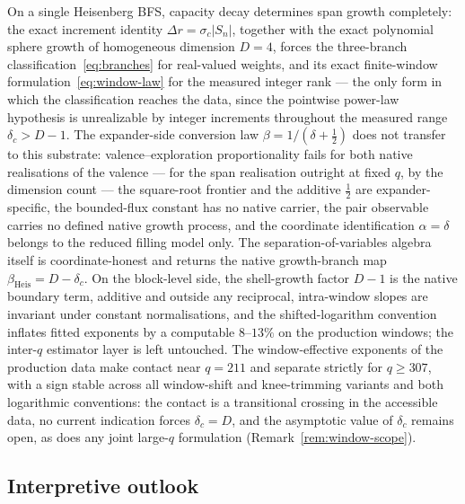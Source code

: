 \documentclass[11pt,a4paper]{article}
\theoremstyle{definition}
\newcommand{\dc}{\delta_c}
\begin{document}
On a single Heisenberg BFS, capacity decay determines span growth completely: the exact increment identity
$\Delta r = \sigma_c |S_n|$, together with the exact polynomial sphere growth of homogeneous dimension
$D = 4$, forces the three-branch classification~\eqref{eq:branches} for real-valued weights, and its exact
finite-window formulation~\eqref{eq:window-law} for the measured integer rank --- the only form in which
the classification reaches the data, since the pointwise power-law hypothesis is unrealizable by integer
increments throughout the measured range $\dc > D - 1$.
The expander-side conversion law $\beta = 1/(\delta + \tfrac12)$ does not transfer to this substrate:
valence--exploration proportionality fails for both native realisations of the valence --- for the span
realisation outright at fixed $q$, by the dimension count --- the square-root frontier and the additive
$\tfrac12$ are
expander-specific, the bounded-flux constant has no native carrier, the pair observable carries no defined
native growth process, and the coordinate identification $\alpha = \delta$ belongs to the reduced filling
model only.
The separation-of-variables algebra itself is coordinate-honest and returns the native growth-branch map
$\beta_{\mathrm{Heis}} = D - \dc$.
On the block-level side, the shell-growth factor $D - 1$ is the native boundary term, additive and outside
any reciprocal, intra-window slopes are invariant under constant normalisations, and the shifted-logarithm
convention inflates fitted exponents by a computable $8$--$13\%$ on the production windows; the inter-$q$
estimator layer is left untouched.
The window-effective exponents of the production data make contact near $q = 211$ and separate strictly for
$q \ge 307$, with a sign stable across all window-shift and knee-trimming variants and both logarithmic
conventions: the contact is a transitional crossing in the accessible data, no current indication forces
$\dc = D$, and the asymptotic value of $\dc$ remains open, as does any joint large-$q$ formulation
(Remark~\ref{rem:window-scope}).

\subsection*{Interpretive outlook}
\end{document}

